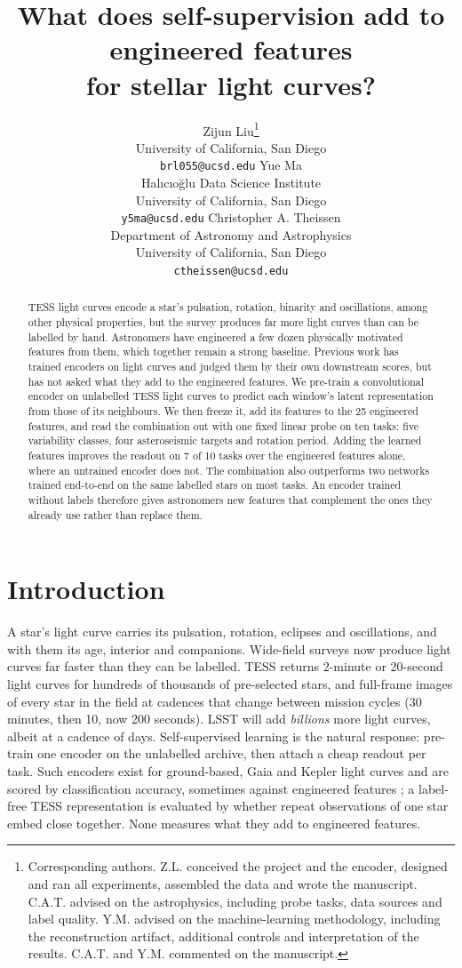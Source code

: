 \documentclass{article}
\title{What does self-supervision add to engineered features\\for stellar light curves?}
\author{%
  Zijun Liu\thanks{Corresponding authors. Z.L. conceived the project and the encoder, designed and
  ran all experiments, assembled the data and wrote the manuscript. C.A.T. advised on the
  astrophysics, including probe tasks, data sources and label quality. Y.M. advised on the machine-learning methodology, including the
  reconstruction artifact, additional controls and interpretation of the results. C.A.T. and Y.M.
  commented on the manuscript.}\\
  University of California, San Diego\\
  \texttt{brl055@ucsd.edu}
  \And
  Yue Ma\footnotemark[1]\\
  Hal\i c\i o\u{g}lu Data Science Institute\\
  University of California, San Diego\\
  \texttt{y5ma@ucsd.edu}
  \And
  Christopher A. Theissen\footnotemark[1]\\
  Department of Astronomy and Astrophysics\\
  University of California, San Diego\\
  \texttt{ctheissen@ucsd.edu}
}
\begin{document}
\maketitle

\begin{abstract}
TESS light curves encode a star's pulsation, rotation, binarity and oscillations, among other physical
properties, but the survey
produces far more light curves than can be labelled by hand. Astronomers have engineered a few
dozen physically motivated features from them, which together remain a strong baseline. Previous work has trained
encoders on light curves and judged them by their own downstream scores, but has not asked what
they add to the engineered features. We pre-train a convolutional encoder on unlabelled TESS light curves to predict each
window's latent representation from those of its neighbours. We then freeze it, add its features to
the 25 engineered features, and read the combination out with one fixed linear probe on ten tasks:
five variability classes, four asteroseismic targets and rotation period. Adding the learned features
improves the readout on 7 of 10 tasks over the engineered features alone, where an untrained encoder
does not. The combination also outperforms two networks trained end-to-end on the same labelled
stars on most tasks. An encoder trained without labels therefore gives astronomers new features
that complement the ones they already use rather than replace them.
\end{abstract}

\section{Introduction}

A star's light curve carries its pulsation, rotation, eclipses and oscillations, and with them its
age, interior and companions. Wide-field surveys now produce light curves far faster
than they can be labelled. TESS
\citep{ricker2015} returns 2-minute or 20-second \citep{huber2022} light curves for hundreds of
thousands of pre-selected stars, and full-frame images of every star in the field at cadences that
change between mission cycles (30 minutes, then 10, now 200 seconds). LSST \citep{ivezic2019}
will add \emph{billions} more light curves, albeit at a cadence of days. Self-supervised learning is the
natural response: pre-train one encoder on the unlabelled archive, then attach a cheap readout per
task. Such encoders exist for ground-based, Gaia and Kepler light curves
\citep{donoso2025astromer2,zuo2025falco,rui2026jepa} and are scored by classification accuracy,
sometimes against engineered features \citep{rui2026jepa}; a label-free TESS representation
\citep{poznanski2026} is evaluated by whether repeat observations of one star embed close together.
None measures what they add to engineered features.
\end{document}
